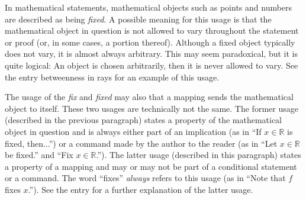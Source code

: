 \documentclass[12pt]{article}
\begin{document}

In mathematical statements, mathematical objects such as points and numbers are described as being \emph{fixed}.  A possible meaning for this usage is that the mathematical object in question is not allowed to vary throughout the statement or proof (or, in some cases, a portion thereof).  Although a fixed object typically does not vary, it is almost always arbitrary.  This may seem paradoxical, but it is quite logical:  An object is chosen arbitrarily, then it is never allowed to vary.  See the entry betweenness in rays for an example of this usage.

The usage of the  \emph{fix} and \emph{fixed} may also  that a mapping sends the mathematical object to itself.  These two usages are technically not the same.  The former usage (described in the previous paragraph) states a property of the mathematical object in question and is always either part of an implication (as in ``If $x \in \mathbb{R}$ is fixed, then...'') or a command made by the author to the reader (as in ``Let $x \in \mathbb{R}$ be fixed.'' and ``Fix $x \in \mathbb{R}$.'').  The latter usage (described in this paragraph) states a property of a mapping and may or may not be part of a conditional statement or a command.  The word ``fixes'' \emph{always} refers to this usage (as in ``Note that $f$ fixes $x$.'').  See the entry  for a further explanation of the latter usage.
\end{document}
